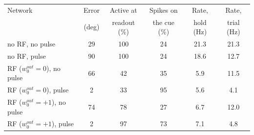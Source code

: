 \begin{tabular}{lccccc}
\toprule
Network & Error & Active at & Spikes on & Rate, & Rate, \\
 & (deg) & readout (\%) & the cue (\%) & hold (Hz) & trial (Hz) \\
\midrule
no RF, no pulse & 29 & 100 & 24 & 21.3 & 21.3 \\
no RF, pulse & 90 & 100 & 24 & 18.6 & 12.7 \\
RF ($w_0^{out}=0$), no pulse & 66 & 42 & 35 & 5.9 & 11.5 \\
RF ($w_0^{out}=0$), pulse & 2 & 33 & 95 & 5.6 & 4.1 \\
RF ($w_0^{out}=+1$), no pulse & 74 & 78 & 27 & 6.7 & 12.0 \\
RF ($w_0^{out}=+1$), pulse & 2 & 97 & 73 & 7.1 & 4.8 \\
\bottomrule
\end{tabular}
